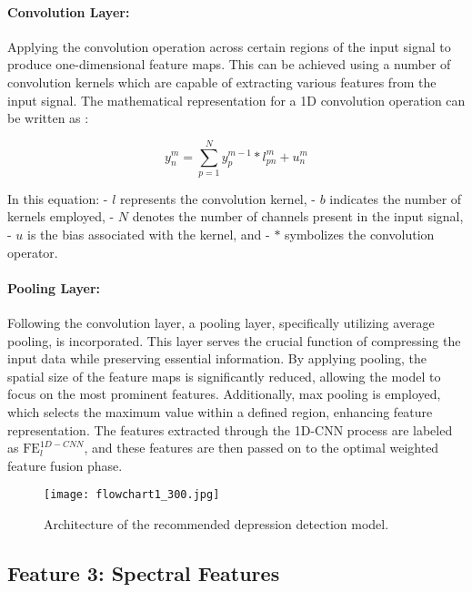 \documentclass[conference]{IEEEtran}
\begin{document}
\paragraph{Convolution Layer:} 

Applying the convolution operation across certain regions of the input signal to produce one-dimensional feature maps. This can be achieved using a number of convolution kernels which are capable of extracting various features from the input signal. The mathematical representation for a 1D convolution operation can be written as :

\[
y^m_n = \sum_{p=1}^{N} y^{m-1}_p * l^m_{pn} + u^m_n  \tag{1}
\] 

In this equation:
- \( l \) represents the convolution kernel,
- \( b \) indicates the number of kernels employed,
- \( N \) denotes the number of channels present in the input signal,
- \( u \) is the bias associated with the kernel, and
- \( * \) symbolizes the convolution operator.

\paragraph{Pooling Layer:} 

Following the convolution layer, a pooling layer, specifically utilizing average pooling, is incorporated. This layer serves the crucial function of compressing the input data while preserving essential information. By applying pooling, the spatial size of the feature maps is significantly reduced, allowing the model to focus on the most prominent features. Additionally, max pooling is employed, which selects the maximum value within a defined region, enhancing feature representation. The features extracted through the 1D-CNN process are labeled as \( \text{FE}^{1D-CNN}_l \), and these features are then passed on to the optimal weighted feature fusion phase.

\begin{figure}[htbp]
\hspace*{0.2cm}
\texttt{[image: flowchart1\_300.jpg]}  %
\caption{Architecture of the recommended depression detection model.}
\label{fig}
\end{figure}


\subsection{Feature 3: Spectral Features}
\end{document}
